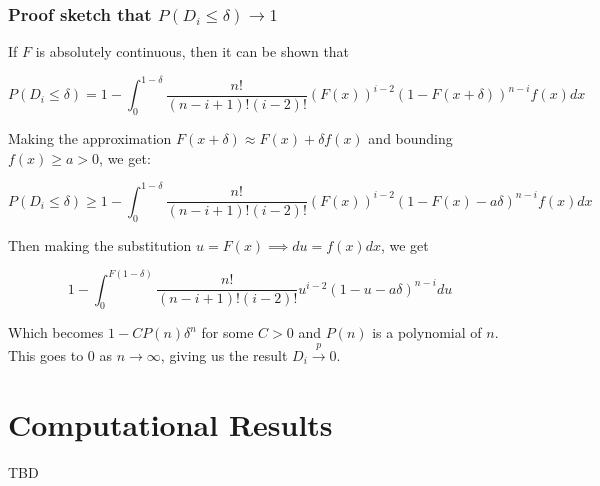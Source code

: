 \documentclass[
  11pt,
]{article}
\begin{document}
\hypertarget{proof-sketch-that-pd_i-leq-delta-to-1}{%
\subsubsection{\texorpdfstring{Proof sketch that
\(P(D_i \leq \delta) \to 1\)}{Proof sketch that P(D\_i \textbackslash leq \textbackslash delta) \textbackslash to 1}}\label{proof-sketch-that-pd_i-leq-delta-to-1}}

If \(F\) is absolutely continuous, then it can be shown that

\[P(D_i \leq \delta) = 1 - \int_0^{1-\delta} \frac{n!}{(n-i+1)! (i-2)!} (F(x))^{i-2} (1 - F(x + \delta))^{n-i} f(x) dx\]

Making the approximation \(F(x+\delta) \approx F(x) + \delta f(x)\) and
bounding \(f(x) \geq a > 0\), we get:

\[P(D_i \leq \delta) \geq 1 - \int_0^{1-\delta} \frac{n!}{(n-i+1)! (i-2)!} (F(x))^{i-2} (1 - F(x) - a \delta)^{n-i} f(x) dx\]

Then making the substitution \(u = F(x) \implies du = f(x) dx\), we get

\[1 - \int_0^{F(1-\delta)} \frac{n!}{(n-i+1)! (i-2)!} u^{i-2} (1 - u - a \delta)^{n-i} du\]

Which becomes \(1 - C P(n) \delta^{n}\) for some \(C > 0\) and \(P(n)\)
is a polynomial of \(n\). This goes to 0 as \(n \to \infty\), giving us
the result \(D_i \stackrel{p}{\to} 0\).

\hypertarget{computational-results}{%
\section{Computational Results}\label{computational-results}}

TBD

  
\end{document}
